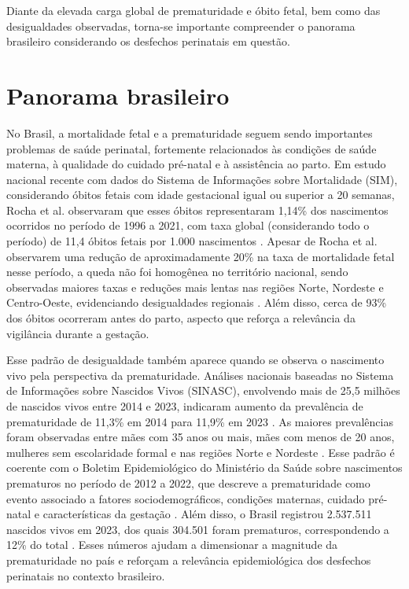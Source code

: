 Diante da elevada carga global de prematuridade e óbito fetal, bem como das 
desigualdades observadas, torna-se importante compreender o panorama brasileiro 
considerando os desfechos perinatais em questão.

\section{Panorama brasileiro}

No Brasil, a mortalidade fetal e a prematuridade seguem sendo importantes problemas 
de saúde perinatal, fortemente relacionados às condições de saúde materna, à qualidade 
do cuidado pré-natal e à assistência ao parto. Em estudo nacional recente com dados do 
Sistema de Informações sobre Mortalidade (SIM), considerando óbitos fetais com idade 
gestacional igual ou superior a 20 semanas, Rocha et al. observaram que esses óbitos 
representaram 1,14\% dos nascimentos ocorridos no período de 1996 a 2021, com taxa 
global (considerando todo o período) de 11,4 óbitos fetais por 1.000 nascimentos 
\cite{rocha2025space}. Apesar de Rocha et al. observarem uma redução de aproximadamente 
20\% na taxa de mortalidade fetal nesse período, a queda não foi homogênea no território 
nacional, sendo observadas maiores taxas e reduções mais lentas nas regiões Norte, 
Nordeste e Centro-Oeste, evidenciando desigualdades regionais \cite{rocha2025space}. 
Além disso, cerca de 93\% dos óbitos ocorreram antes do parto, aspecto que reforça a 
relevância da vigilância durante a gestação.

Esse padrão de desigualdade também aparece quando se observa o nascimento vivo pela 
perspectiva da prematuridade. Análises nacionais baseadas no Sistema de Informações 
sobre Nascidos Vivos (SINASC), envolvendo mais de 25,5 milhões de nascidos vivos 
entre 2014 e 2023, indicaram aumento da prevalência de prematuridade de 11,3\% em 
2014 para 11,9\% em 2023 \cite{Victor2025PretermBrazil}. As maiores prevalências 
foram observadas entre mães com 35 anos ou mais, mães com menos de 20 anos, mulheres 
sem escolaridade formal e nas regiões Norte e Nordeste \cite{Victor2025PretermBrazil}. 
Esse padrão é coerente com o Boletim Epidemiológico do Ministério da Saúde sobre 
nascimentos prematuros no período de 2012 a 2022, que descreve a prematuridade 
como evento associado a fatores sociodemográficos, condições maternas, cuidado 
pré-natal e características da gestação \cite{BrasilBoletimPrematuridade2024}. 
Além disso, o Brasil registrou 2.537.511 nascidos vivos em 2023, dos quais 304.501 foram 
prematuros, correspondendo a 12\% do total \cite{OOBrPainelVigilancia}. 
Esses números ajudam a dimensionar a magnitude da prematuridade no país e reforçam 
a relevância epidemiológica dos desfechos perinatais no contexto brasileiro.

